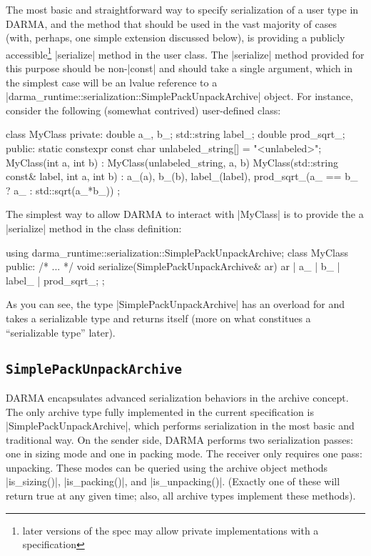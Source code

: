 The most basic and straightforward way to specify serialization of a user type
in DARMA, and the method that should be used in the vast majority of cases
(with, perhaps, one simple extension discussed below), is providing a publicly
accessible\footnote{later versions of the spec may allow private
implementations with a  specification} |serialize| method
in the user class.  The |serialize| method provided for this purpose should be
non-|const| and should take a single argument, which in the simplest case will
be an lvalue reference to a
|darma_runtime::serialization::SimplePackUnpackArchive| object.  For instance,
consider the following (somewhat contrived) user-defined class:
%
\begin{CppCodeNumb}
class MyClass {
  private:
    double a_, b_;
    std::string label_;
    double prod_sqrt_;
  public:
    static constexpr const char unlabeled_string[] = "<unlabeled>";
    MyClass(int a, int b)
      : MyClass(unlabeled_string, a, b)
    { }
    MyClass(std::string const& label, int a, int b)
      : a_(a), b_(b), label_(label),
        prod_sqrt_(a_ == b_ ? a_ : std::sqrt(a_*b_))
    { }
};
\end{CppCodeNumb}
%
The simplest way to allow DARMA to interact with |MyClass| is to provide the
a |serialize| method in the class definition:
\begin{CppCodeNumb}
using darma_runtime::serialization::SimplePackUnpackArchive;
class MyClass {
  public:
    /* ... */
    void serialize(SimplePackUnpackArchive& ar) {
      ar | a_ | b_ | label_ | prod_sqrt_;
    }
};
\end{CppCodeNumb}
As you can see, the type |SimplePackUnpackArchive| has an overload for
 and takes a serializable type and returns itself (more
on what constitues a ``serializable type'' later).

\subsection{\texttt{SimplePackUnpackArchive}}

DARMA encapsulates advanced serialization behaviors in the archive
\gls{concept}.  The only archive type fully implemented in the current
specification is |SimplePackUnpackArchive|, which performs serialization in the
most basic and traditional way.  On the sender side, DARMA performs
two serialization passes: one in sizing mode and one in packing mode.  The receiver
only requires one pass: unpacking.  These modes can be queried using the archive
object methods |is_sizing()|, |is_packing()|, and |is_unpacking()|.  (Exactly
one of these will return true at any given time; also, all archive types
implement these methods).

